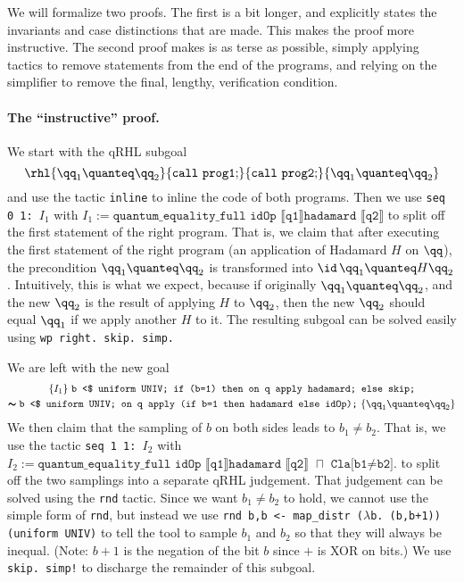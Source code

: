 \documentclass{article}
\begin{document}
We will formalize two proofs. The first is a bit longer, and
explicitly states the invariants and case distinctions that are
made. This makes the proof more instructive. The second proof makes is
as terse as possible, simply applying tactics to remove statements
from the end of the programs, and relying on the simplifier to remove
the final, lengthy, verification condition.

\paragraph{The ``instructive'' proof.} We start with the qRHL subgoal
\[
\rhl{\qq_1\quanteq \qq_2} {\mathtt{call\ prog1;}} {\mathtt{call\ prog2;}} {\qq_1\quanteq \qq_2}
\]
and use the tactic \texttt{inline} to inline the code of both
programs. Then we use \texttt{seq 0 1: $I_1$}
with
$I_1:=\texttt{quantum\_equality\_full idOp
  $\llbracket$q1$\rrbracket$
  hadamard $\llbracket$q2$\rrbracket$}$
to split off the first statement of the right program. That is, we
claim that after executing the first statement of the right program
(an application of Hadamard $H$
on $\qq$),
the precondition $\qq_1\quanteq\qq_2$
is transformed into $\id\,\qq_1\quanteq H\qq_2$.
Intuitively, this is what we expect, because if originally
$\qq_1\quanteq \qq_2$,
and the new $\qq_2$
is the result of applying $H$
to $\qq_2$,
then the new $\qq_2$
should equal $\qq_1$
if we apply another $H$
to it. The resulting subgoal can be solved easily using \texttt{\frenchspacing wp
  right. skip. simp.}

We are left with the new goal
\begin{multline*}
  \{I_1\}\
  {\texttt{b <\$ uniform UNIV;
      if (b=1) then on q apply hadamard; else skip;}} \\
  \pmb\sim
  {\texttt{b <\$ uniform UNIV;
      on q apply (if b=1 then hadamard else idOp);}}
  \
  \{\qq_1\quanteq\qq_2\}
\end{multline*}
We then claim that the sampling of $b$
on both sides leads to $b_1\neq b_2$.
That is, we use the tactic \texttt{seq 1 1: $I_2$}
with
$I_2:=\texttt{quantum\_equality\_full idOp
  $\llbracket$q1$\rrbracket$
  hadamard $\llbracket$q2$\rrbracket$
  $\sqcap$ Cla[b1≠b2].}$ to split off the two samplings into a separate qRHL
judgement. That judgement can be solved using the \texttt{rnd}
tactic. Since we want $b_1\neq b_2$
to hold, we cannot use the simple form of \texttt{rnd}, but instead we
use \texttt{\frenchspacing rnd b,b <- map\_distr ($\lambda$b.
  (b,b+1)) (uniform UNIV)} to tell the tool to sample $b_1$
and $b_2$
so that they will always be inequal. (Note: $b+1$
is the negation of the bit $b$
since $+$
is XOR on bits.)  We use \texttt{\frenchspacing skip. simp!} to discharge the remainder of
this subgoal.
\end{document}
